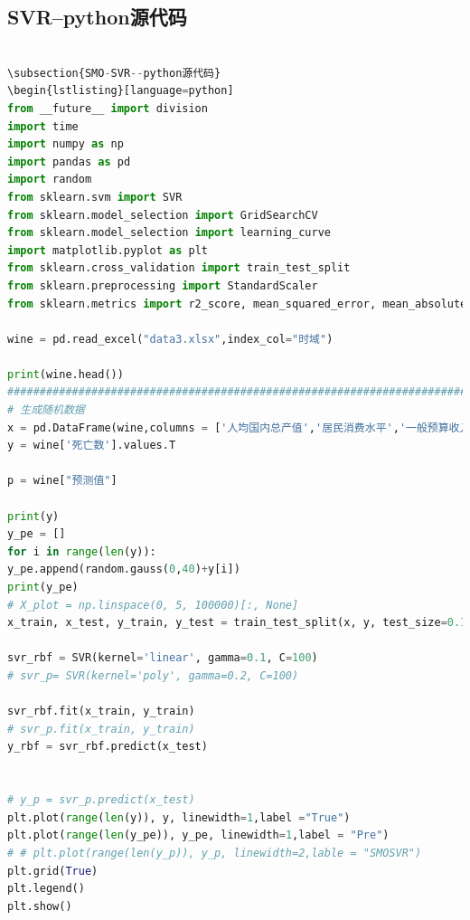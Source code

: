 \documentclass{whutmod}
\begin{document}
\subsection{SVR--python源代码}
\begin{lstlisting}[language=python]

\subsection{SMO-SVR--python源代码}
\begin{lstlisting}[language=python]
from __future__ import division
import time
import numpy as np
import pandas as pd
import random
from sklearn.svm import SVR
from sklearn.model_selection import GridSearchCV
from sklearn.model_selection import learning_curve
import matplotlib.pyplot as plt
from sklearn.cross_validation import train_test_split
from sklearn.preprocessing import StandardScaler
from sklearn.metrics import r2_score, mean_squared_error, mean_absolute_error

wine = pd.read_excel("data3.xlsx",index_col="时域")

print(wine.head())
#############################################################################
# 生成随机数据
x = pd.DataFrame(wine,columns = ['人均国内总产值','居民消费水平','一般预算收入'])
y = wine['死亡数'].values.T

p = wine["预测值"]

print(y)
y_pe = []
for i in range(len(y)):
y_pe.append(random.gauss(0,40)+y[i])
print(y_pe)
# X_plot = np.linspace(0, 5, 100000)[:, None]
x_train, x_test, y_train, y_test = train_test_split(x, y, test_size=0.15, random_state=33)

svr_rbf = SVR(kernel='linear', gamma=0.1, C=100)
# svr_p= SVR(kernel='poly', gamma=0.2, C=100)

svr_rbf.fit(x_train, y_train)
# svr_p.fit(x_train, y_train)
y_rbf = svr_rbf.predict(x_test)


# y_p = svr_p.predict(x_test)
plt.plot(range(len(y)), y, linewidth=1,label ="True")
plt.plot(range(len(y_pe)), y_pe, linewidth=1,label = "Pre")
# # plt.plot(range(len(y_p)), y_p, linewidth=2,lable = "SMOSVR")
plt.grid(True)
plt.legend()
plt.show()

\end{lstlisting}
\end{document}

